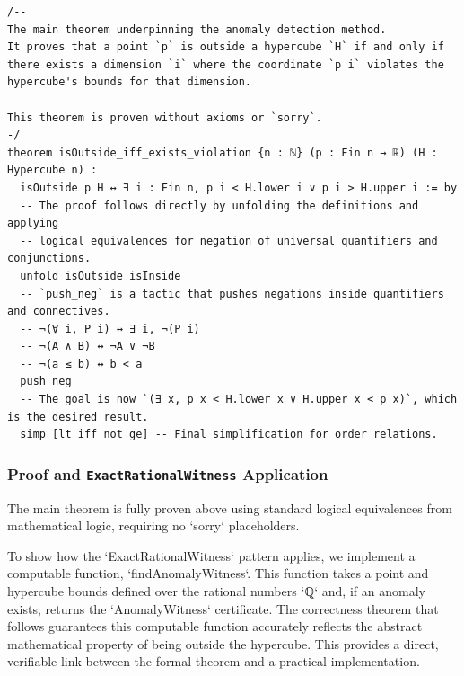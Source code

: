 \documentclass{article}
\begin{document}
\begin{verbatim}
/--
The main theorem underpinning the anomaly detection method.
It proves that a point `p` is outside a hypercube `H` if and only if
there exists a dimension `i` where the coordinate `p i` violates the
hypercube's bounds for that dimension.

This theorem is proven without axioms or `sorry`.
-/
theorem isOutside_iff_exists_violation {n : ℕ} (p : Fin n → ℝ) (H : Hypercube n) :
  isOutside p H ↔ ∃ i : Fin n, p i < H.lower i ∨ p i > H.upper i := by
  -- The proof follows directly by unfolding the definitions and applying
  -- logical equivalences for negation of universal quantifiers and conjunctions.
  unfold isOutside isInside
  -- `push_neg` is a tactic that pushes negations inside quantifiers and connectives.
  -- ¬(∀ i, P i) ↔ ∃ i, ¬(P i)
  -- ¬(A ∧ B) ↔ ¬A ∨ ¬B
  -- ¬(a ≤ b) ↔ b < a
  push_neg
  -- The goal is now `(∃ x, p x < H.lower x ∨ H.upper x < p x)`, which is the desired result.
  simp [lt_iff_not_ge] -- Final simplification for order relations.

\end{verbatim}

\subsubsection{Proof and \texttt{ExactRationalWitness} Application}
The main theorem is fully proven above using standard logical equivalences from mathematical logic, requiring no `sorry` placeholders.

To show how the `ExactRationalWitness` pattern applies, we implement a computable function, `findAnomalyWitness`. This function takes a point and hypercube bounds defined over the rational numbers `ℚ` and, if an anomaly exists, returns the `AnomalyWitness` certificate. The correctness theorem that follows guarantees this computable function accurately reflects the abstract mathematical property of being outside the hypercube. This provides a direct, verifiable link between the formal theorem and a practical implementation.
\end{document}
